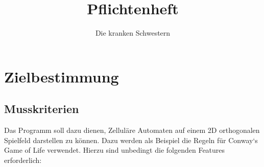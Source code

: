 \documentclass[11pt,a4paper]{article}
\begin{document}

\title{Pflichtenheft}

\author{Die kranken Schwestern}

\tableofcontents
\pagebreak

\section{Zielbestimmung}
\subsection{Musskriterien}
Das Programm soll dazu dienen, Zelluläre Automaten auf einem 2D orthogonalen Spielfeld darstellen zu können. Dazu werden als Beispiel die Regeln für Conway`s Game of Life verwendet.
Hierzu sind unbedingt die folgenden Features erforderlich:

\par
\end{document}
